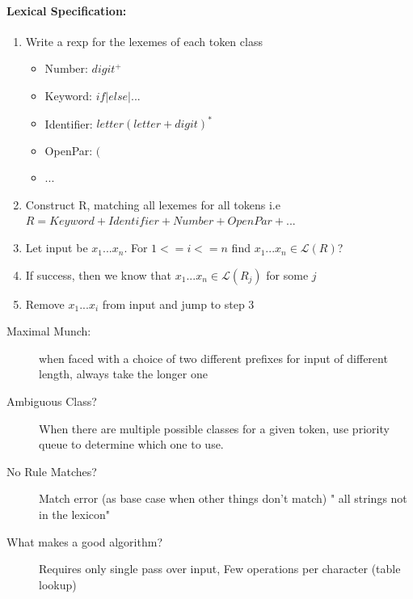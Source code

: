 \documentclass[a4paper, 10pt]{article}
\begin{document}
\paragraph{Lexical Specification:}
\begin{enumerate}
	\item Write a rexp for the lexemes of each token class
	      \begin{itemize}
		      \item Number: $digit^+$
		      \item Keyword: $if | else | ...$
		      \item Identifier: $letter(letter + digit)^*$
		      \item OpenPar: $($
		      \item ...
	      \end{itemize}
	\item Construct R, matching all lexemes for all tokens i.e $R = Keyword + Identifier + Number + OpenPar + ...$
	\item Let input be $x_1 ... x_n$. For $1 <= i <= n$ find $x_1 ... x_n \in \mathcal{L}(R)$?
	\item If success, then we know that $x_1 ... x_n \in \mathcal{L}(R_j)$ for some $j$
	\item Remove $x_1 ... x_i$ from input and jump to step 3
\end{enumerate}

\begin{description}
	\item[Maximal Munch:] when faced with a choice of two different prefixes for input of different length, always take the longer one
\end{description}

\begin{description}
	\item[Ambiguous Class?]
	      When there are multiple possible classes for a given token, use priority queue to determine which one to use.
\end{description}

\begin{description}
	\item[No Rule Matches?]
	      Match error (as base case when other things don't match) " all strings not in the lexicon"
\end{description}

\begin{description}
	\item[What makes a good algorithm?] Requires only single pass over input, Few operations per character (table lookup)
\end{description}
\end{document}
